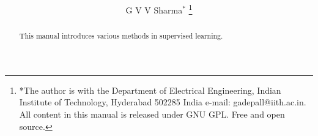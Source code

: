 \documentclass[journal,12pt,twocolumn]{IEEEtran}
\renewcommand\thesection{\arabic{section}}
\begin{document}
\let\StandardTheFigure\thefigure
\renewcommand{\thefigure}{\thesection}



\makeatletter
{}
\makeatother

\let\StandardTheFigure\thefigure
\let\StandardTheTable\thetable
\let\vec\mathbf





\def\putbox#1#2#3{\makebox[0in][l]{\makebox[#1][l]{}\raisebox{\baselineskip}[0in][0in]{\raisebox{#2}[0in][0in]{#3}}}}
     \def\rightbox#1{\makebox[0in][r]{#1}}
     \def\centbox#1{\makebox[0in]{#1}}
     \def\topbox#1{\raisebox{-\baselineskip}[0in][0in]{#1}}
     \def\midbox#1{\raisebox{-0.5\baselineskip}[0in][0in]{#1}}

\vspace{3cm}

\title{ 
}

\author{ G V V Sharma$^{*}$%
	\thanks{*The author is with the Department
		of Electrical Engineering, Indian Institute of Technology, Hyderabad
		502285 India e-mail:  gadepall@iith.ac.in. All content in this manual is released under GNU GPL.  Free and open source.}
	
}	

\maketitle

\tableofcontents

\bigskip

\renewcommand{\thefigure}{\theenumi}
\renewcommand{\thetable}{\theenumi}


\begin{abstract}
	
This manual introduces various methods in supervised learning.
\end{abstract}
\end{document}
